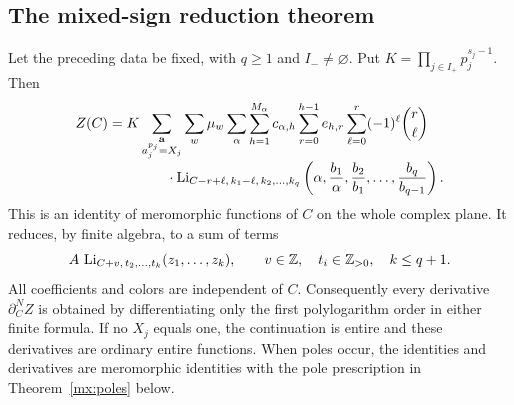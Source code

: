 \subsection{The mixed-sign reduction theorem}

\begin{theorem}
\label{mx:main}
Let the preceding data be fixed, with $q\geq1$ and $I_-\ne\varnothing$.
Put $K=\prod_{j\in I_+}p_j^{s_j-1}$.  Then
\begin{align}\label{mx:mainformula}
 Z(C)={}&K\sum_{\substack{\mathbf a\\a_j^{p_j}=X_j}}
       \sum_w\mu_w\sum_\alpha\sum_{h=1}^{M_\alpha}
           c_{\alpha,h}
       \sum_{r=0}^{h-1}e_{h,r}\sum_{\ell=0}^r
           (-1)^\ell\binom r\ell\notag\\[-1mm]
 &\hspace{10mm}\cdot
 \mxLi_{C-r+\ell,\,k_1-\ell,\,k_2,\ldots,k_q}
 \left(\alpha,\frac{b_1}\alpha,
                  \frac{b_2}{b_1},\ldots,\frac{b_q}{b_{q-1}}\right).
\end{align}
This is an identity of meromorphic functions of $C$ on the whole
complex plane.  It reduces, by finite algebra, to a sum of terms
\begin{equation}\label{mx:positiveoutput}
 A\,\operatorname{Li}_{C+v,\,t_2,\ldots,t_k}(z_1,\ldots,z_k),
 \qquad v\in\mathbb Z,\quad t_i\in\mathbb Z_{>0},\quad k\leq q+1.
\end{equation}
All coefficients and colors are independent of $C$.  Consequently
every derivative $\partial_C^N Z$ is obtained by differentiating only
the first polylogarithm order in either finite formula.  If no $X_j$
equals one, the continuation is entire and these derivatives are
ordinary entire functions.  When poles occur, the identities and
derivatives are meromorphic identities with the pole prescription in
Theorem~\ref{mx:poles} below.
\end{theorem}


